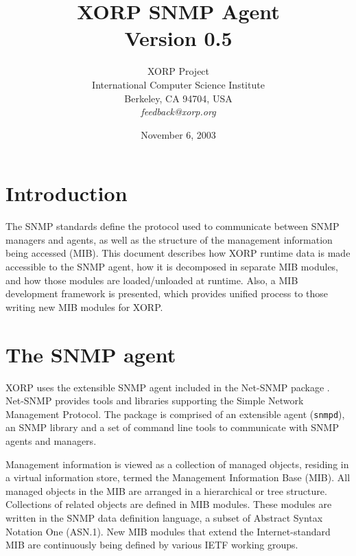 \documentclass[11pt]{article}
\begin{document}
\title{XORP SNMP Agent \\
\vspace{1ex}
Version 0.5}
\author{ XORP Project					\\
	 International Computer Science Institute	\\
	 Berkeley, CA 94704, USA			\\
	 {\it feedback@xorp.org}
}
\date{November 6, 2003}

\maketitle

\thispagestyle{empty}


\section{Introduction}


The SNMP standards \cite{STD0062} define the protocol used to communicate
between SNMP managers and agents, as well as the structure of the management
information being accessed (MIB).  This document describes how XORP runtime data
is made accessible to the SNMP agent, how it is decomposed in separate MIB
modules, and how those modules are loaded/unloaded at runtime.  Also, a MIB
development framework is presented, which provides unified process to those
writing new MIB modules for XORP.

\section{The SNMP agent}

XORP uses the extensible SNMP agent included in the Net-SNMP package
\cite{net-snmp}.  Net-SNMP provides tools and libraries supporting the Simple
Network Management Protocol.  The package is comprised of an extensible agent
(\texttt{snmpd}), an SNMP library and a set of command line tools to
communicate with SNMP agents and managers. 

Management information is viewed as a collection of managed objects, residing
in a virtual information store, termed the Management Information Base (MIB).
All managed objects in the MIB are arranged in a hierarchical or tree
structure.  Collections of related objects are defined in MIB modules.  These
modules are written in the SNMP data definition language, a subset of Abstract
Syntax Notation One (ASN.1).  New MIB modules that extend the Internet-standard
MIB are continuously being defined by various IETF working groups.  
\end{document}
